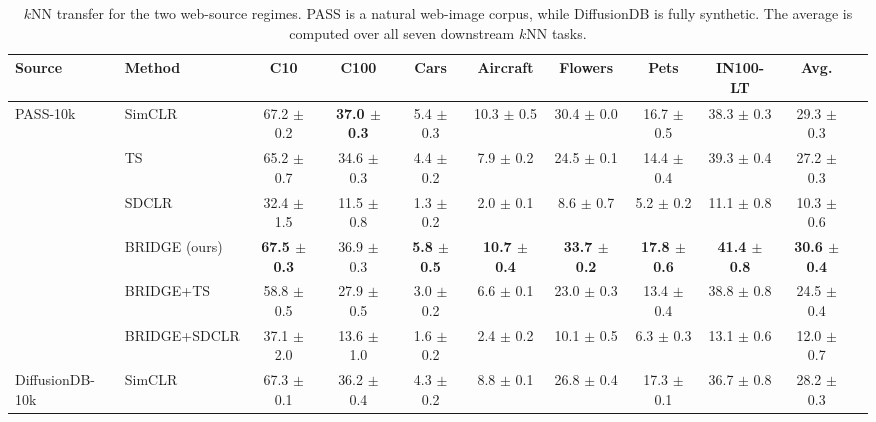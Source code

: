 \begin{table}[t]
\centering
\tiny
\setlength{\tabcolsep}{3.0pt}
\caption{$k$NN transfer for the two web-source regimes. PASS is a natural web-image corpus, while DiffusionDB is fully synthetic. The average is computed over all seven downstream $k$NN tasks.}
\label{tab:main_sota_web_sources_knn}
\begin{adjustbox}{max width=\textwidth}
\begin{tabular}{l l c c c c c c c c c}
\toprule
Source & Method & C10 & C100 & Cars & Aircraft & Flowers & Pets & IN100-LT & Avg. \\
\midrule
PASS-10k & SimCLR & 67.2 {\scriptsize$\pm$ 0.2} & \textbf{37.0 {\scriptsize$\pm$ 0.3}} & 5.4 {\scriptsize$\pm$ 0.3} & 10.3 {\scriptsize$\pm$ 0.5} & 30.4 {\scriptsize$\pm$ 0.0} & 16.7 {\scriptsize$\pm$ 0.5} & 38.3 {\scriptsize$\pm$ 0.3} & 29.3 {\scriptsize$\pm$ 0.3} \\
 & TS & 65.2 {\scriptsize$\pm$ 0.7} & 34.6 {\scriptsize$\pm$ 0.3} & 4.4 {\scriptsize$\pm$ 0.2} & 7.9 {\scriptsize$\pm$ 0.2} & 24.5 {\scriptsize$\pm$ 0.1} & 14.4 {\scriptsize$\pm$ 0.4} & 39.3 {\scriptsize$\pm$ 0.4} & 27.2 {\scriptsize$\pm$ 0.3} \\
 & SDCLR & 32.4 {\scriptsize$\pm$ 1.5} & 11.5 {\scriptsize$\pm$ 0.8} & 1.3 {\scriptsize$\pm$ 0.2} & 2.0 {\scriptsize$\pm$ 0.1} & 8.6 {\scriptsize$\pm$ 0.7} & 5.2 {\scriptsize$\pm$ 0.2} & 11.1 {\scriptsize$\pm$ 0.8} & 10.3 {\scriptsize$\pm$ 0.6} \\
 & \rowcolor{blue!10} BRIDGE (ours) & \textbf{67.5 {\scriptsize$\pm$ 0.3}} & 36.9 {\scriptsize$\pm$ 0.3} & \textbf{5.8 {\scriptsize$\pm$ 0.5}} & \textbf{10.7 {\scriptsize$\pm$ 0.4}} & \textbf{33.7 {\scriptsize$\pm$ 0.2}} & \textbf{17.8 {\scriptsize$\pm$ 0.6}} & \textbf{41.4 {\scriptsize$\pm$ 0.8}} & \textbf{30.6 {\scriptsize$\pm$ 0.4}} \\
 & BRIDGE+TS & 58.8 {\scriptsize$\pm$ 0.5} & 27.9 {\scriptsize$\pm$ 0.5} & 3.0 {\scriptsize$\pm$ 0.2} & 6.6 {\scriptsize$\pm$ 0.1} & 23.0 {\scriptsize$\pm$ 0.3} & 13.4 {\scriptsize$\pm$ 0.4} & 38.8 {\scriptsize$\pm$ 0.8} & 24.5 {\scriptsize$\pm$ 0.4} \\
 & BRIDGE+SDCLR & 37.1 {\scriptsize$\pm$ 2.0} & 13.6 {\scriptsize$\pm$ 1.0} & 1.6 {\scriptsize$\pm$ 0.2} & 2.4 {\scriptsize$\pm$ 0.2} & 10.1 {\scriptsize$\pm$ 0.5} & 6.3 {\scriptsize$\pm$ 0.3} & 13.1 {\scriptsize$\pm$ 0.6} & 12.0 {\scriptsize$\pm$ 0.7} \\
\midrule
DiffusionDB-10k & SimCLR & 67.3 {\scriptsize$\pm$ 0.1} & 36.2 {\scriptsize$\pm$ 0.4} & 4.3 {\scriptsize$\pm$ 0.2} & 8.8 {\scriptsize$\pm$ 0.1} & 26.8 {\scriptsize$\pm$ 0.4} & 17.3 {\scriptsize$\pm$ 0.1} & 36.7 {\scriptsize$\pm$ 0.8} & 28.2 {\scriptsize$\pm$ 0.3} \\

\end{tabular}
\end{adjustbox}
\end{table}
